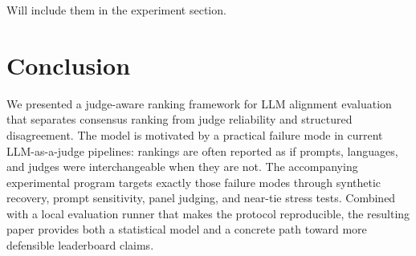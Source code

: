 \documentclass{article}
\begin{document}
\begin{bibunit}[unsrtnat]
{Will include them in the experiment section.

}




\section{Conclusion}

We presented a judge-aware ranking framework for LLM alignment evaluation that separates consensus ranking from judge reliability and structured disagreement. The model is motivated by a practical failure mode in current LLM-as-a-judge pipelines: rankings are often reported as if prompts, languages, and judges were interchangeable when they are not. The accompanying experimental program targets exactly those failure modes through synthetic recovery, prompt sensitivity, panel judging, and near-tie stress tests. Combined with a local evaluation runner that makes the protocol reproducible, the resulting paper provides both a statistical model and a concrete path toward more defensible leaderboard claims.




% 
% 
\putbib[references]
\end{bibunit}

\clearpage
\end{document}
